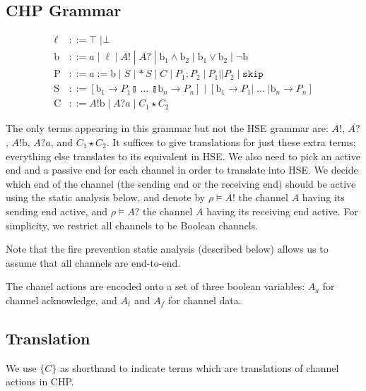 \documentclass[times, 10pt]{article}
\begin{document}
\subsection{CHP Grammar}
\begin{align*}
    \ell & ::= \top \; | \bot \\
    \mathrm{b} & ::= a \; | \; \ell \; | \; \overline{A!} \; | \; \overline{A?} \; | \; \mathrm{b}_1 \wedge \mathrm{b}_2 \; | \; \mathrm{b}_1 \vee \mathrm{b}_2 \; | \; \lnot \mathrm{b} \\
    \mathrm{P} & ::= a := \mathrm{b} \; | \; S \; | \, *S \; | \; C \; | \; P_1; P_2 \; | \: P_1 || P_2 \; | \; \mathtt{skip} \\
    \mathrm{S} & ::= [ \mathrm{b}_1 \rightarrow P_1 \talloblong \; \ldots \; \talloblong \mathrm{b}_n \rightarrow P_n ] \; | \; [ \mathrm{b}_1 \rightarrow P_1 | \; \ldots \; | \mathrm{b}_n \rightarrow P_n ] \\
    \mathrm{C} & ::= A!\mathrm{b} \; | \; A?a \; | \; C_1 \star C_2
\end{align*}

The only terms appearing in this grammar but not the HSE grammar are:
$\overline{A!}$, $\overline{A?}$, $A!\mathrm{b}$, $A?a$, and $C_1 \star C_2$.
It suffices to give translations for just these extra terms; everything else
translates to its equivalent in HSE. We also need to pick an active end and a
passive end for each channel in order to translate into HSE.  We decide which
end of the channel (the sending end or the receiving end) should be active using
the static analysis below, and denote by $\rho \vDash A!$ the channel $A$ having
its sending end active, and $\rho \vDash A?$ the channel $A$ having its
receiving end active.  For simplicity, we restrict all channels to be Boolean
channels.

Note that the fire prevention static analysis (described below) allows us to assume that all
channels are end-to-end.

The chanel actions are encoded onto a set of three boolean variables: $A_a$ for
channel acknowledge, and $A_t$ and $A_f$ for channel data.

\subsection{Translation}

We use $\{C\}$ as shorthand to indicate terms which are translations of channel
actions in CHP.
\end{document}
